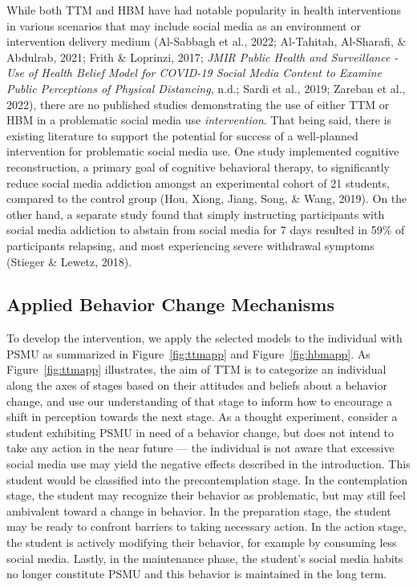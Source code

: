 \documentclass[
  man]{apa6}
\begin{document}
While both TTM and HBM have had notable popularity in health interventions in
various scenarios that may include social media as an environment or
intervention delivery medium (Al-Sabbagh et al., 2022; Al-Tahitah, Al-Sharafi, \& Abdulrab, 2021; Frith \& Loprinzi, 2017; \emph{{JMIR Public Health} and {Surveillance} - {Use} of {Health Belief Model} for {COVID-19 Social Media Content} to {Examine Public Perceptions} of {Physical Distancing}}, n.d.; Sardi et al., 2019; Zareban et al., 2022), there are
no published studies demonstrating the use of either TTM or HBM in a
problematic social media use \emph{intervention}. That being said, there is existing literature
to support the potential for success of a well-planned intervention for problematic social
media use. One study implemented cognitive reconstruction, a primary goal of
cognitive behavioral therapy, to significantly reduce social media addiction
amongst an experimental cohort of 21 students, compared to the control group (Hou, Xiong, Jiang, Song, \& Wang, 2019). On the other hand, a separate study found that
simply instructing participants with social media addiction to abstain from
social media for 7 days resulted in 59\% of participants relapsing, and most
experiencing severe withdrawal symptoms (Stieger \& Lewetz, 2018).

\hypertarget{applied-behavior-change-mechanisms}{%
\subsection{Applied Behavior Change Mechanisms}\label{applied-behavior-change-mechanisms}}

To develop the intervention, we apply the selected models to the individual
with PSMU as summarized in Figure~\ref{fig:ttmapp} and
Figure~\ref{fig:hbmapp}.
As Figure~\ref{fig:ttmapp} illustrates, the aim of TTM is to categorize
an individual along the axes of stages based on their attitudes and beliefs
about a behavior change, and use our understanding of that stage to inform how
to encourage a shift in perception towards the next stage.
As a thought experiment, consider a student exhibiting PSMU in need of a
behavior change, but does not intend to take any action in the near future --- the
individual is not aware that excessive social media use may yield the negative effects
described in the introduction. This student would be classified into the
precontemplation stage. In the contemplation stage, the student may recognize their
behavior as problematic, but may still feel ambivalent toward a change in
behavior. In the preparation stage, the student may be ready to confront
barriers to taking necessary action. In the action stage, the student is actively
modifying their behavior, for example by consuming less social media. Lastly,
in the maintenance phase, the student's social media habits no longer constitute PSMU and
this behavior is maintained in the long term.
\end{document}

